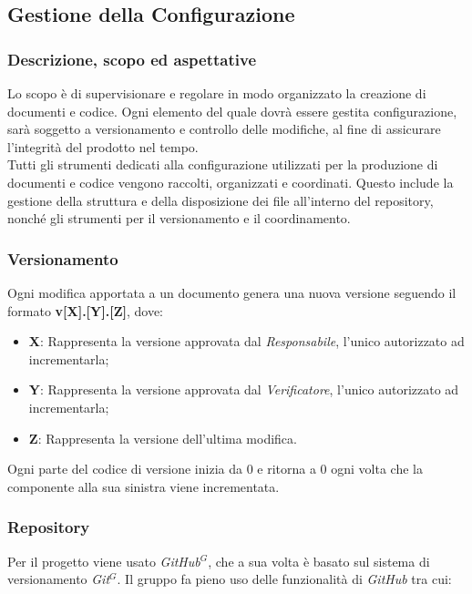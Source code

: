 \nonstopmode
\pagebreak
\pagebreak
\subsection{Gestione della Configurazione}

\subsubsection{Descrizione, scopo ed aspettative}
    Lo scopo è di supervisionare e regolare in modo organizzato la creazione di
    documenti e codice. Ogni elemento del quale dovrà essere gestita configurazione, sarà soggetto a versionamento
    e controllo delle modifiche, al fine di assicurare l'integrità del prodotto
    nel tempo.
    \\
    Tutti gli strumenti dedicati alla configurazione utilizzati per la produzione
    di documenti e codice vengono raccolti, organizzati e coordinati. Questo include
    la gestione della struttura e della disposizione dei file all'interno del repository,
    nonché gli strumenti per il versionamento e il coordinamento.

\subsubsection{Versionamento}
Ogni modifica apportata a un documento genera una nuova versione seguendo il formato
\textbf{v[X].[Y].[Z]}, dove:

\begin{itemize}
\item \textbf{X}: Rappresenta la versione approvata dal \emph{Responsabile}, l'unico autorizzato ad incrementarla;
\item \textbf{Y}: Rappresenta la versione approvata dal \emph{Verificatore}, l'unico autorizzato ad incrementarla;
\item \textbf{Z}: Rappresenta la versione dell'ultima modifica.
\end{itemize}
Ogni parte del codice di versione inizia da 0 e ritorna a 0 ogni volta che la componente alla sua sinistra
viene incrementata.
\subsubsection{Repository}
    Per il progetto viene usato \emph{GitHub}$^{G}$, che a sua volta è basato sul sistema di versionamento
    \emph{Git}$^{G}$. Il gruppo fa pieno uso delle funzionalità di \emph{GitHub} tra cui:

